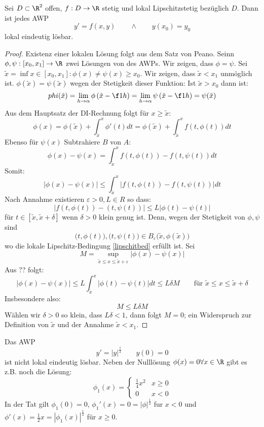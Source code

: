 \documentclass[a4paper,10pt]{scrartcl}
\begin{document}
\begin{thm}
Sei $ D \subset \R^2$ offen, $f:D\to \R$ stetig und lokal Lipschitzstetig bezüglich $D$. Dann ist jedes
AWP
\[
y'=f(x,y) \qquad\land\qquad y(x_0)=y_0
\]
lokal eindeutig lösbar. 
\begin{proof}
Existenz einer lokalen Lösung folgt aus dem Satz von Peano.
Seinn $\phi, \psi: [x_0,x_1] \to \R$ zwei Lösungen von des AWPs. Wir zeigen, dass $\phi=\psi$.
Sei $\tilde x = \inf{x\in [x_0,x_1]: \phi(x)\ne\psi(x)} \ge x_0$.
Wir zeigen, dass $\tilde x<x_1$ unmöglich ist. $\phi(\tilde x) = \psi(\tilde x)$ wegen der Stetigkeit dieser
Funktion:
Ist $\tilde x > x_0$
dann ist:
\[
phi(\tilde x)= \lim_{h\to\alpha}\phi\left(\tilde x - \f 1h\right)=\lim_{h\to\alpha}\psi\left(\tilde x - \f 1h\right) = \psi(\tilde x)
\]
Aus dem Hauptsatz der DI-Rechnung folgt für $x\ge\tilde x$:
\[
\phi(x)= \phi(\tilde x)+\int_{\tilde x}^x\phi'(t)dt
=\phi(\tilde x) + \int_{\tilde x}^xf(t,\phi(t))dt
\]
Ebenso für $\psi(x)$
Subtrahiere $B$ von $A$:
\[
\phi(x)-\psi(x)=\int_{\tilde x}^xf(t,\phi(t))-f(t,\psi(t))dt
\]
Somit:
\[
|\phi(x)-\psi(x)| \le \int_{\tilde x}^x|f(t,\phi(t)) - f(t,\psi(t))|dt
\]
Nach Annahme existieren $\varepsilon > 0, L\in R$ so dass:
\[
\label{libschitzbed}
|f(t,\phi(t)) -(t,\psi(t))| \le L|\phi(t)-\psi(t)|
\]
für $t\in[\tilde x, \tilde x +\delta]$ wenn $\delta >0$ klein genug ist. Denn, wegen der Stetigkeit von $\phi,\psi$ sind
\[
	\big(t,\phi(t)\big),\big(t,\psi(t)\big)\in B_\varepsilon\big(\tilde x, \phi(\tilde x)\big)
\]
wo die lokale Lipschitz-Bedingung \eqref{lipschitbed} erfüllt ist.
Sei 
\[
M=\sup_{\tilde x \le x \le \tilde x + \varepsilon}|\phi(x)-\psi(x)|
\]
Aus ?? folgt:
\[
|\phi(x)-\psi(x)|\le L\int_{\tilde x}^x|\phi(t)-\psi(t)|dt \le L\delta M \qquad \text{für } \tilde x \le x \le \tilde x+\delta
\]
Insbesondere also: 
\[
M\le L\delta M
\]
Wählen wir $\delta >0$ so klein, dass $L\delta <1$, dann folgt $M=0$;
ein Widerspruch zur Definition von $\tilde x$ und der Annahme $\tilde x<x_1$.
\end{proof}
\end{thm}

\begin{ex*}
Das AWP
\[
y'=|y|^{\frac 12} \qquad y(0)=0
\]
ist nicht lokal eindeutig lösbar. Neben der Nulllösung $\phi(x)=0 \forall x\in\R$ gibt es z.B. noch die Lösung:
\[
\phi_1(x)=
\begin{cases}
\frac 14 x^2 &x\ge 0\\
0 &x<0
\end{cases}
\]
In der Tat gilt $\phi_1(0)=0$, $\phi_1'(x)=0=|\phi|^{\frac 12}$ fur $x<0$ und $\phi'(x)=\frac 12 x = |\phi_1(x)|^{\frac 12}$ für $x\ge0$.
\end{ex*}
\end{document}
